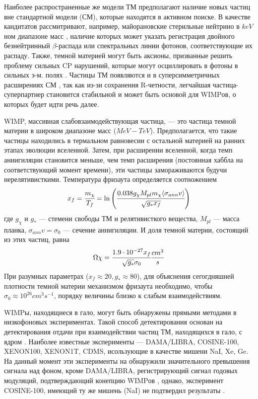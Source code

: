 Наиболее распространенные же модели ТМ предполагают наличие новых частиц вне 
стандартной модели (СМ), которые находятся в активном поиске. В качестве кандитатов рассмитривают, например, майорановские стерильные нейтрино в $keV$ном диапазоне масс \cite{Boyarsky_2019}, наличие которых может указать регистрация двойного безнейтринный $\beta$-распада или спектральных линии фотонов, соответствующие их распаду. Также, темной материей могут быть аксионы, призванные решить проблему сильных CP нарушений, которые могут осциллировать в фотоны в сильных э-м. полях \cite{adams2023axion}. Частицы ТМ появляются и в суперсимметричных расширениях СМ \cite{berezinsky1996dark}, так как из-зи сохранения R-четности, легчайшая частица-суперпартнер становится стабильной и может быть основой для WIMPов, о которых будет идти речь далее.

WIMP, массивная слабовзаимодействующая частица, --- это частица темной материи в широком диапазоне масс ($MeV-TeV$). Предполагается, что такие частицы находились в термальном равновесии с остальной материей на ранних этапах эволюции вселенной. Затем, при расширении вселенной, когда темп аниигиляции становится меньше, чем темп расширения (постоянная хаббла на соответствующий момент времени), эти частицы замораживаются будучи нерелятивисткими\cite{Kolb:1990vq}. Температура фризаута определяется соотножением 
\begin{equation}
	x_f = \cfrac{m_{\chi} }{T_f} = \ln {\left(\cfrac{0.038 g_{\chi} M_{pl} m_{\chi}  \langle \sigma_{ann} v \rangle}
		{\sqrt{g_* x_f}}\right)}
\end{equation}
где $g_{\chi}$ и $g_*$ --- стемени свободы ТМ и релятивисткого вещества, $M_{pl}$ --- масса планка, $\sigma_{ann} v = \sigma_0$ --- сечение аннигиляции. И доля темной материи, состоящий из этих частиц, равна 
\begin{equation}
	\Omega{\chi} = \cfrac{{1.9}\cdot 10^{-27} x_f}{\sqrt{g_*} \sigma_0} \frac{cm^3}{s}
\end{equation}
При разумных параметрах ($x_f \approx 20, g_* \approx 80$), для объяснения сегогдняшней плотности темной материи механизмом фризаута необходимо, чтобы $\sigma_0 \approx 10^{26} cm^3s^{-1}$, порядку величины близко к слабым взаимодействиям.

WIMPы, находящиеся в гало, могут быть обнаружены прямыми методами в низкофоновых экспериментах. Такой способ детектирования основан на детектирования отдачи при взаимодействии частиц ТМ, находящихся в гало, с ядром \cite{Schumann_2019}. Наиболее известные эксперименты --- DAMA/LIBRA, COSINE-100, XENON100, XENON1T, CDMS, исользующие в качестве мишени NaI, Xe, Ge. На данный момент эти эксперименты на обнаружили значительного превышения сигнала над фоном, кроме DAMA/LIBRA, регистрирующий сигнал годовых модуляций, подтверждающий конепцию WIMPов \cite{Bernabei_2018}, однако, эксперимент COSINE-100, имеющий ту же мишень (NaI)  не подтвердил результаты \cite{Adhikari_2022}.

